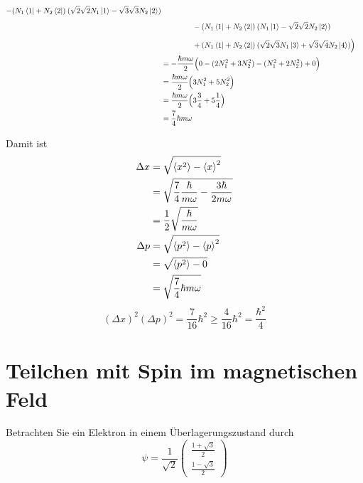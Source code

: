 \documentclass{scrartcl}
\begin{document}
\begin{enumerate}[a)]
\begin{align*}
					- (N_1 \bra 1 + N_2 \bra 2)\: (\sqrt 2 \sqrt 2 N_1\ket 1 - \sqrt 3 \sqrt 3  N_2\ket 2) \\
				&\phantom{=\frac 12 \frac{\hbar}{m\omega} \Big(}
					- (N_1 \bra 1 + N_2 \bra 2)\: (N_1\ket 1 - \sqrt 2 \sqrt 2 N_2\ket 2) \\
				&\phantom{=\frac 12 \frac{\hbar}{m\omega} \Big(}
					+ (N_1 \bra 1 + N_2 \bra 2)\:(\sqrt 2 \sqrt 3 N_1\ket 3 + \sqrt  3 \sqrt 4 N_2\ket 4) \Big)\\		
				&=  -\frac{\hbar m \omega}{2}  \Big(
					0 -(2N_1^2 + 3 N_2^2) - (N_1^2 + 2 N_2^2) + 0
				\Big)\\	
				&= \frac{\hbar m \omega}{2}  \Big( 3N_1^2 + 5 N_2^2 \Big)\\
				&= \frac{\hbar m \omega}{2} \Big( 3\frac{3}{4} + 5 \frac{1}{4} \Big) \\
				&= \frac 74 \hbar m \omega \\
\end{align*}

Damit ist 
\begin{align*}
\Delta x	&= \sqrt{\braket{x^2}-\braket{x}^2}	\\
			&= \sqrt{\frac 74 \frac{\hbar}{m\omega} - \frac{3\hbar}{2m\omega}} \\
			&= \frac{1}{2}\sqrt{\frac{\hbar}{m\omega}} \\
\Delta p	&= \sqrt{\braket{p^2}-\braket{p}^2}	\\
			&= \sqrt{\braket{p^2}-0}	\\
			&= \sqrt{\frac 74 \hbar m \omega}
\end{align*}
\[(\Delta x)^2 (\Delta p)^2 = \frac{7}{16}\hbar^2 \geq \frac{4}{16}\hbar^2 = \frac{\hbar^2}{4}\]
\end{enumerate}

\section{Teilchen mit Spin im magnetischen Feld}
Betrachten Sie ein Elektron in einem Überlagerungszustand durch
\[\psi=\frac{1}{\sqrt 2}\begin{pmatrix}\frac{1+\sqrt 3}{2}\\\frac{1-\sqrt 3}{2}\end{pmatrix}\]
\end{document}
